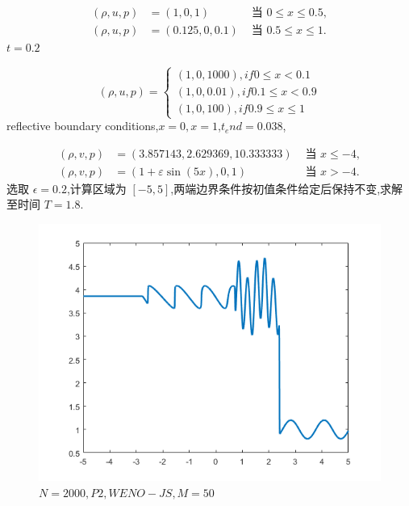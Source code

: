 \documentclass{book}
\begin{document}
\begin{example}
  \begin{equation}
    \begin{aligned}
      (\rho, u, p) & =(1,0,1)       & \text { 当 }0\leqslant x \leq 0.5,      \\
      (\rho, u, p) & =(0.125,0,0.1) & \text { 当 }0.5\leqslant x\leqslant 1 .
    \end{aligned}
  \end{equation}
  $t=0.2$
\end{example}
\begin{example}
  \begin{equation}
    (\rho,u,p)=
    \begin{cases}
      (1,0,1000), if 0\leqslant x<0.1      \\
      (1,0,0.01), if 0.1 \leqslant x < 0.9 \\
      (1,0,100),if 0.9\leqslant x \leqslant 1
    \end{cases}
  \end{equation}
  reflective boundary conditions,$x=0,x=1$,$t_end=0.038$,
\end{example}
\begin{example}
  \begin{equation}
    \begin{aligned}
      (\rho, v, p) & =(3.857143,2.629369,10.333333)   & \text { 当 } x \leq-4, \\
      (\rho, v, p) & =(1+\varepsilon \sin (5 x), 0,1) & \text { 当 } x>-4 .
    \end{aligned}
  \end{equation}
  选取 $\epsilon = 0.2$,计算区域为 $[-5,5]$,两端边界条件按初值条件给定后保持不变,求解至时间 $T=1.8$.
  \begin{figure}[htp]
    \centering
    \label{fig:shu_Osher}
    \includegraphics[width=0.7\linewidth]{fig/Shu_Osher.png}
    \caption{$N=2000,P2,WENO-JS,M=50$}
  \end{figure}

\end{example}
\end{document}
